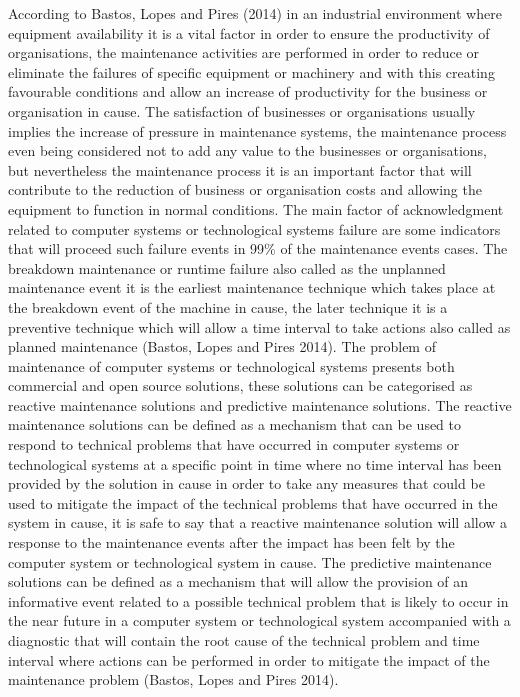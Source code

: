 According to Bastos, Lopes and Pires (2014) in an industrial environment where equipment availability it is
a vital factor in order to ensure the productivity of organisations, the maintenance activities are performed
in order to reduce or eliminate the failures of specific equipment or machinery and with this creating
favourable conditions and allow an increase of productivity for the business or organisation in cause.
The satisfaction of businesses or organisations usually implies the increase of pressure in maintenance systems,
the maintenance process even being considered not to add any value to the businesses or organisations,
but nevertheless the maintenance process it is an important factor that will contribute to the reduction of
business or organisation costs and allowing the equipment to function in normal conditions. The main factor
of acknowledgment related to computer systems or technological systems failure are some indicators that will
proceed such failure events in 99\% of the maintenance events cases. The breakdown maintenance or runtime
failure also called as the unplanned maintenance event it is the earliest maintenance technique which takes
place at the breakdown event of the machine in cause, the later technique it is a preventive technique which
will allow a time interval to take actions also called as planned maintenance (Bastos, Lopes and Pires 2014).
The problem of maintenance of computer systems or technological systems presents both commercial and open
source solutions, these solutions can be categorised as reactive maintenance solutions and predictive
maintenance solutions. The reactive maintenance solutions can be defined as a mechanism that can be used to
respond to technical problems that have occurred in computer systems or technological systems at a specific
point in time where no time interval has been provided by the solution in cause in order to take any measures
that could be used to mitigate the impact of the technical problems that have occurred in the system in cause,
it is safe to say that a reactive maintenance solution will allow a response to the maintenance events after
the impact has been felt by the computer system or technological system in cause. The predictive maintenance
solutions can be defined as a mechanism that will allow the provision of an informative event related to a
possible technical problem that is likely to occur in the near future in a computer system or technological
system accompanied with a diagnostic that will contain the root cause of the technical problem and time
interval where actions can be performed in order to mitigate the impact of the maintenance problem
(Bastos, Lopes and Pires 2014).

